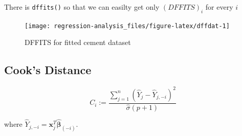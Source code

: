 \documentclass[]{book}
\newenvironment{Shaded}{\begin{snugshade}}{\end{snugshade}}
\newcommand{\DataTypeTok}[1]{\textcolor[rgb]{0.13,0.29,0.53}{#1}}
\newcommand{\DecValTok}[1]{\textcolor[rgb]{0.00,0.00,0.81}{#1}}
\newcommand{\KeywordTok}[1]{\textcolor[rgb]{0.13,0.29,0.53}{\textbf{#1}}}
\newcommand{\NormalTok}[1]{#1}
\newcommand{\OperatorTok}[1]{\textcolor[rgb]{0.81,0.36,0.00}{\textbf{#1}}}
\newcommand{\StringTok}[1]{\textcolor[rgb]{0.31,0.60,0.02}{#1}}
\theoremstyle{definition}
\theoremstyle{definition}
\theoremstyle{definition}
\theoremstyle{remark}
\let\BeginKnitrBlock\begin \let\EndKnitrBlock\end
\begin{document}
There is \texttt{dffits()} so that we can easilty get only \((DFFITS)_i\) for every \(i\)

\begin{Shaded}
\end{Shaded}

\begin{figure}[H]

{\centering \texttt{[image: regression-analysis\_files/figure-latex/dffdat-1]} 

}

\caption{DFFITS for fitted cement dataset}\label{fig:dffdat}
\end{figure}

\hypertarget{cooks-distance}{%
\subsection{Cook's Distance}\label{cooks-distance}}

\BeginKnitrBlock{definition}[Cook\'s distance]
\protect\hypertarget{def:cook}{}{\label{def:cook} {} }\[C_i := \frac{\sum\limits_{j = 1}^n (\hat{Y}_j - \hat{Y}_{j, -i})^2}{\hat\sigma (p + 1)}\]

where \(\hat{Y}_{j, -i} = \mathbf{x}_j^T \boldsymbol{\hat\beta}_{(-i)}\).
\EndKnitrBlock{definition}
\end{document}
